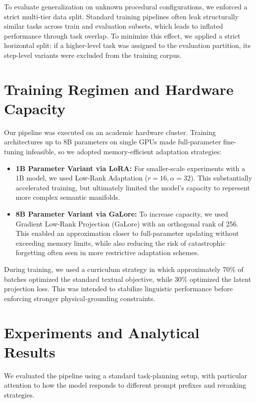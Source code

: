 \documentclass{article}
\begin{document}
To evaluate generalization on unknown procedural configurations, we enforced a strict multi-tier data split. Standard training pipelines often leak structurally similar tasks across train and evaluation subsets, which leads to inflated performance through task overlap. To minimize this effect, we applied a strict horizontal split: if a higher-level task was assigned to the evaluation partition, its step-level variants were excluded from the training corpus.

\section{Training Regimen and Hardware Capacity}

Our pipeline was executed on an academic hardware cluster. Training architectures up to 8B parameters on single GPUs made full-parameter fine-tuning infeasible, so we adopted memory-efficient adaptation strategies:
\begin{itemize}[topsep=0pt, leftmargin=1.5em]
    \item \textbf{1B Parameter Variant via LoRA:} For smaller-scale experiments with a 1B model, we used Low-Rank Adaptation ($r=16, \alpha=32$). This substantially accelerated training, but ultimately limited the model's capacity to represent more complex semantic manifolds.
    \item \textbf{8B Parameter Variant via GaLore:} To increase capacity, we used Gradient Low-Rank Projection (GaLore) with an orthogonal rank of 256. This enabled an approximation closer to full-parameter updating without exceeding memory limits, while also reducing the risk of catastrophic forgetting often seen in more restrictive adaptation schemes.
\end{itemize}

During training, we used a curriculum strategy in which approximately 70\% of batches optimized the standard textual objective, while 30\% optimized the latent projection loss. This was intended to stabilize linguistic performance before enforcing stronger physical-grounding constraints.

\section{Experiments and Analytical Results}

We evaluated the pipeline using a standard task-planning setup, with particular attention to how the model responds to different prompt prefixes and reranking strategies.
\end{document}
